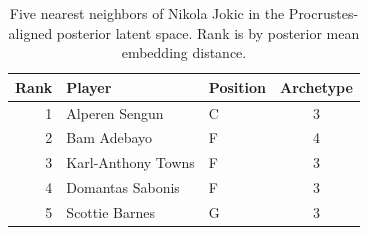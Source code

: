 \begin{table}[htbp]
  \centering\small
  \begin{tabular}{rllc}
    \toprule
    Rank & Player & Position & Archetype \\
    \midrule
    1 & Alperen Sengun & C & 3 \\
    2 & Bam Adebayo & F & 4 \\
    3 & Karl-Anthony Towns & F & 3 \\
    4 & Domantas Sabonis & F & 3 \\
    5 & Scottie Barnes & G & 3 \\
    \bottomrule
  \end{tabular}
  \caption{Five nearest neighbors of Nikola Jokic in the Procrustes-aligned posterior latent space. Rank is by posterior mean embedding distance.}
  \label{tab:Nikola_Jokic_neighbors}
\end{table}

